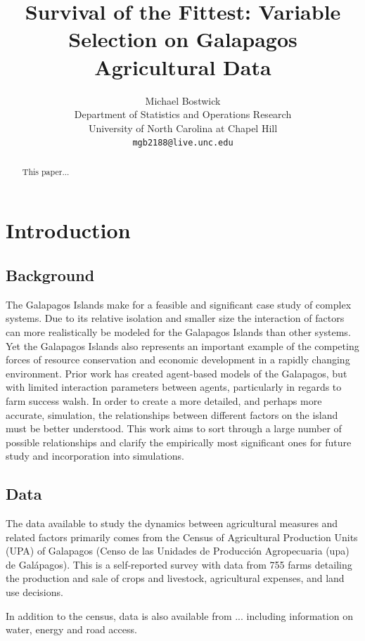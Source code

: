 \documentclass{article}
\title{Survival of the Fittest: Variable Selection on Galapagos Agricultural Data}
\author{
  Michael Bostwick\\
  Department of Statistics and Operations Research\\
  University of North Carolina at Chapel Hill\\
  \texttt{mgb2188@live.unc.edu} \\
}
\begin{document}
\maketitle
\begin{abstract}
  This paper...
  
  \end{abstract}

\section{Introduction}

\subsection{Background}

The Galapagos Islands make for a feasible and significant case study of complex systems. Due to its relative isolation and smaller size the interaction of factors can more realistically be modeled for the Galapagos Islands than other systems. Yet the Galapagos Islands also represents an important example of the competing forces of resource conservation and economic development in a rapidly changing environment. Prior work has created agent-based models of the Galapagos, but with limited interaction parameters between agents, particularly in regards to farm success walsh. In order to create a more detailed, and perhaps more accurate, simulation, the relationships between different factors on the island must be better understood. This work aims to sort through a large number of possible relationships and clarify the empirically most significant ones for future study and incorporation into simulations. 

\subsection{Data}

The data available to study the dynamics between agricultural measures and related factors primarily 
comes from the Census of Agricultural Production Units (UPA) of Galapagos (Censo de las Unidades 
de Producci\'on Agropecuaria (upa) de Gal\'apagos). This is a self-reported survey with data from 755 
farms detailing the production and sale of crops and livestock, agricultural expenses, and land use 
decisions.

In addition to the census, data is also available from ... including information on water, energy and road access.
\end{document}
